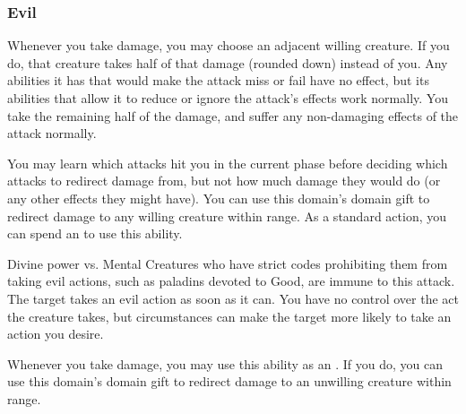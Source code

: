         \subsubsection{Evil}
             Whenever you take damage, you may choose an adjacent willing creature.
            If you do, that creature takes half of that damage (rounded down) instead of you.
            Any abilities it has that would make the attack miss or fail have no effect, but its abilities that allow it to reduce or ignore the attack's effects work normally.
            You take the remaining half of the damage, and suffer any non-damaging effects of the attack normally.
            \par You may learn which attacks hit you in the current phase before deciding which attacks to redirect damage from, but not how much damage they would do (or any other effects they might have).
             You can use this domain's domain gift to redirect damage to any willing creature within \rngclose range.
             As a standard action, you can spend an  to use this ability.
            \begin{ability}
                \begin{spelltargetinginfo}
                \end{spelltargetinginfo}
                \begin{spelleffects}
                    \begin{spellattack}{Divine power vs. Mental}
                        \spellspecial Creatures who have strict codes prohibiting them from taking evil actions, such as paladins devoted to Good, are immune to this attack.
                        \spellsuccess The target takes an evil action as soon as it can.
                        You have no control over the act the creature takes, but circumstances can make the target more likely to take an action you desire.
                    \end{spellattack}
                \end{spelleffects}
            \end{ability}
             Whenever you take damage, you may use this ability as an .
            If you do, you can use this domain's domain gift to redirect damage to an unwilling creature within \rngmed range.

